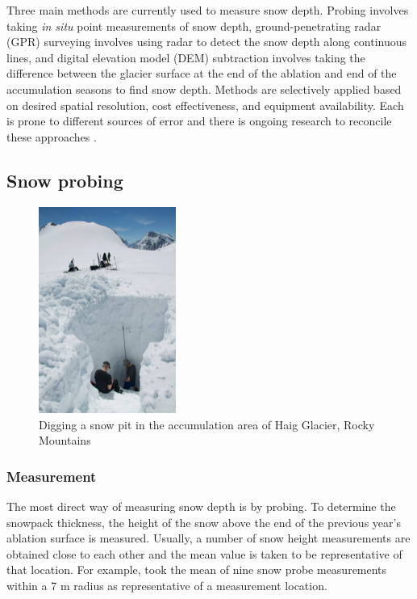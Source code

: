 \documentclass{sfuthesis}
\begin{document}
Three main methods are currently used to measure snow depth. Probing involves taking \textit{in situ} point measurements of snow depth, ground-penetrating radar (GPR) surveying involves using radar to detect the snow depth along continuous lines, and digital elevation model (DEM) subtraction involves taking the difference between the glacier surface at the end of the ablation and end of the accumulation seasons to find snow depth. Methods are selectively applied based on desired spatial resolution, cost effectiveness, and equipment availability. Each is prone to different sources of error and there is ongoing research to reconcile these approaches \citep{Sold2014}.  

\subsection{Snow probing}
\label{snowprobing}
\begin{figure}
 \centering
      \includegraphics[width=0.4\textwidth]{snowpit.jpg}
  \caption{Digging a snow pit in the accumulation area of Haig Glacier, Rocky Mountains}
        \label{snowpit}
\end{figure}

\subsubsection{Measurement}
The most direct way of measuring snow depth is by probing. To determine the snowpack thickness, the height of the snow above the end of the previous year's ablation surface is measured. Usually, a number of snow height measurements are obtained close to each other and the mean value is taken to be representative of that location. For example, \cite{Machguth2006} took the mean of nine snow probe measurements within a 7 m radius as representative of a measurement location.  
\end{document}
